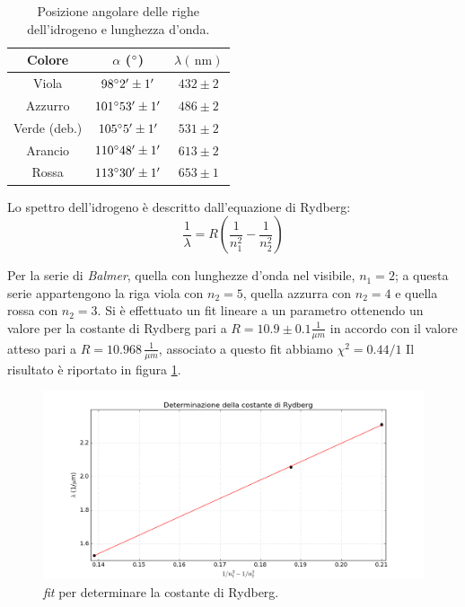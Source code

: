 \documentclass[10pt,a4paper]{article}
\begin{document}
\begin{table}[!htb]
\centering
\begin{tabular}{|c|c|c|}
\hline
Colore & $\alpha$ ($\degree$) & $\lambda (\,\mbox{nm})$\\
\hline 
Viola & $98 \degree 2' \pm 1'$ & $432 \pm 2$ \\ 
\hline 
Azzurro & $101 \degree 53' \pm 1'$ & $486 \pm 2 $ \\ 
\hline 
Verde (deb.)& $105 \degree 5' \pm 1'$ & $531 \pm 2$ \\ 
\hline
Arancio & $110 \degree 48' \pm 1'$ & $613 \pm 2 $ \\ 
\hline 
Rossa & $113 \degree 30' \pm 1'$ & $653 \pm 1$ \\ 
\hline 
\end{tabular} 
\caption{Posizione angolare delle righe dell'idrogeno e lunghezza d'onda.}\label{idrogeno}
\end{table}

Lo spettro dell'idrogeno è descritto dall'equazione di Rydberg:
\begin{equation}
\frac{1}{\lambda}= R \left( \frac{1}{n_{1}^2}-\frac{1}{n_{2}^2} \right)
\end{equation}

Per la serie di \emph{Balmer}, quella con lunghezze d'onda nel visibile, $n_1=2$; a questa serie appartengono la riga viola con $n_2=5$, quella azzurra con $n_2=4$ e quella rossa con $n_2=3$. Si è effettuato un fit lineare a un parametro ottenendo un valore per la costante di Rydberg pari a $R = 10.9 \pm 0.1 \frac{1}{\mu m}$ in accordo con il valore atteso pari a $R=10.968\, \frac{1}{\mu m}$, associato a questo fit abbiamo $\chi^2 = 0.44/1$ Il risultato è riportato in figura \ref{pin}.\\

\begin{figure}[!htb]
  \centering
  \includegraphics[scale=0.6]{ryd.png}
\caption{\emph{fit} per determinare la costante di Rydberg.}
\label{pin}
\end{figure}
\end{document}
